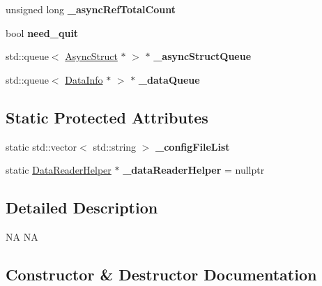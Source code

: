 \begin{DoxyCompactItemize}
unsigned long {\bfseries \+\_\+async\+Ref\+Total\+Count}
\item 
\mbox{\label{classcocostudio_1_1DataReaderHelper_a36c02e8478e3a0c37e5a7c869657d303}} 
bool {\bfseries need\+\_\+quit}
\item 
\mbox{\label{classcocostudio_1_1DataReaderHelper_a83479231a466a8c9f85f84d930fd6038}} 
std\+::queue$<$ \hyperlink{structcocostudio_1_1DataReaderHelper_1_1__AsyncStruct}{Async\+Struct} $\ast$ $>$ $\ast$ {\bfseries \+\_\+async\+Struct\+Queue}
\item 
\mbox{\label{classcocostudio_1_1DataReaderHelper_ad357513010f34d35c5024a59ceb7267b}} 
std\+::queue$<$ \hyperlink{structcocostudio_1_1DataReaderHelper_1_1__DataInfo}{Data\+Info} $\ast$ $>$ $\ast$ {\bfseries \+\_\+data\+Queue}
\end{DoxyCompactItemize}
\subsection*{Static Protected Attributes}
\begin{DoxyCompactItemize}
\item 
\mbox{\label{classcocostudio_1_1DataReaderHelper_ad1db980684810cb7e5ee349b58cc4ba4}} 
static std\+::vector$<$ std\+::string $>$ {\bfseries \+\_\+config\+File\+List}
\item 
\mbox{\label{classcocostudio_1_1DataReaderHelper_a9abe72e03095a8db1c5b17937dbebcf6}} 
static \hyperlink{classcocostudio_1_1DataReaderHelper}{Data\+Reader\+Helper} $\ast$ {\bfseries \+\_\+data\+Reader\+Helper} = nullptr
\end{DoxyCompactItemize}


\subsection{Detailed Description}
NA  NA 

\subsection{Constructor \& Destructor Documentation}
\mbox{\label{classcocostudio_1_1DataReaderHelper_ae39a521709c689eedae55a47f622c623}} 
